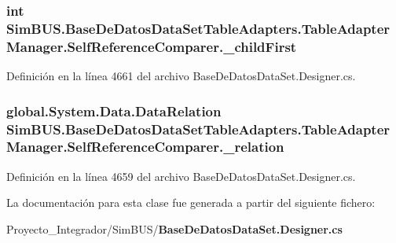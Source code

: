 \subsubsection[{\-\_\-child\-First}]{\setlength{\rightskip}{0pt plus 5cm}int Sim\-B\-U\-S.\-Base\-De\-Datos\-Data\-Set\-Table\-Adapters.\-Table\-Adapter\-Manager.\-Self\-Reference\-Comparer.\-\_\-child\-First\hspace{0.3cm}{\ttfamily [private]}}\label{class_sim_b_u_s_1_1_base_de_datos_data_set_table_adapters_1_1_table_adapter_manager_1_1_self_reference_comparer_a08893f223fb8ff191aecf87cd85312c3}


Definición en la línea 4661 del archivo Base\-De\-Datos\-Data\-Set.\-Designer.\-cs.

\subsubsection[{\-\_\-relation}]{\setlength{\rightskip}{0pt plus 5cm}global.\-System.\-Data.\-Data\-Relation Sim\-B\-U\-S.\-Base\-De\-Datos\-Data\-Set\-Table\-Adapters.\-Table\-Adapter\-Manager.\-Self\-Reference\-Comparer.\-\_\-relation\hspace{0.3cm}{\ttfamily [private]}}\label{class_sim_b_u_s_1_1_base_de_datos_data_set_table_adapters_1_1_table_adapter_manager_1_1_self_reference_comparer_a330d946c3a3ae0530e98fe67c2435b09}


Definición en la línea 4659 del archivo Base\-De\-Datos\-Data\-Set.\-Designer.\-cs.



La documentación para esta clase fue generada a partir del siguiente fichero\-:\begin{DoxyCompactItemize}
\item 
Proyecto\-\_\-\-Integrador/\-Sim\-B\-U\-S/{\bf Base\-De\-Datos\-Data\-Set.\-Designer.\-cs}\end{DoxyCompactItemize}
